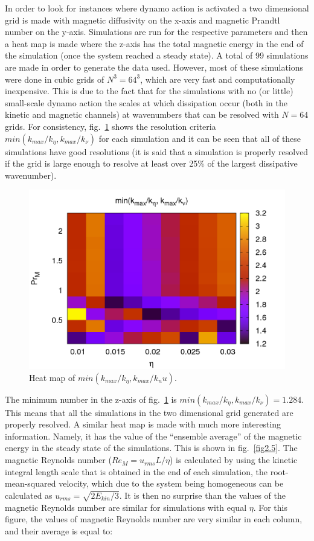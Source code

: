 \documentclass[a4paper,12pt]{article}
\begin{document}
In order to look for instances where dynamo action is activated a two dimensional grid is made with magnetic diffusivity on the x-axis and magnetic Prandtl number on the y-axis. Simulations are run for the respective parameters and then a heat map is made where the z-axis has the total magnetic energy in the end of the simulation (once the system reached a steady state). A total of 99 simulations are made in order to generate the data used. However, most of these simulations were done in cubic grids of $N^3=64^3$, which are very fast and computationally inexpensive. This is due to the fact that for the simulations with no (or little) small-scale dynamo action the scales at which dissipation occur (both in the kinetic and magnetic channels) at wavenumbers that can be resolved with $N=64$ grids. For consistency, fig.~\ref{fig2.4} shows the resolution criteria $min(k_{max} / k_\eta, k_{max} / k_\nu)$ for each simulation and it can be seen that all of these simulations have good resolutions (it is said that a simulation is properly resolved if the grid is large enough to resolve at least over 25\% of the largest dissipative wavenumber). 

\begin{figure}[h!]
  \centering
  \includegraphics[width=0.7\linewidth]{img/dynamo_ks}
  \caption{Heat map of $min(k_{max}/k_\eta, k_{max}/k_nu)$.}
  \label{fig2.4}
\end{figure}

The minimum number in the z-axis of fig.~\ref{fig2.4} is $min(k_{max} / k_\eta, k_{max} / k_\nu) = 1.284$. This means that all the simulations in the two dimensional grid generated are properly resolved. A similar heat map is made with much more interesting information. Namely, it has the value of the ``ensemble average'' of the magnetic energy in the steady state of the simulations. This is shown in fig.~\ref{fig2.5}. The magnetic Reynolds number ($Re_M = u_{rms} L / \eta$) is calculated by using the kinetic integral length scale that is obtained in the end of each simulation, the root-mean-squared velocity, which due to the system being homogeneous can be calculated as $u_{rms} = \sqrt{2 E_{kin} / 3}$. It is then no surprise than the values of the magnetic Reynolds number are similar for simulations with equal $\eta$.  For this figure, the values of magnetic Reynolds number are very similar in each column, and their average is equal to:
\end{document}
